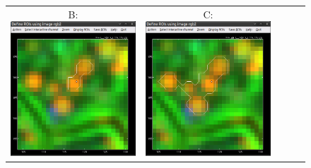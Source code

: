 \documentclass[a4paper, 11pt]{article}
\begin{document}
\begin{figure}[!ht]
\begin{tabular}{ccccc}
B: \includegraphics[scale=0.23]{figs3/LANS-roi-interactive1}
&
C: \includegraphics[scale=0.23]{figs3/LANS-roi-interactive2}

\end{tabular}
\end{figure}
\end{document}
